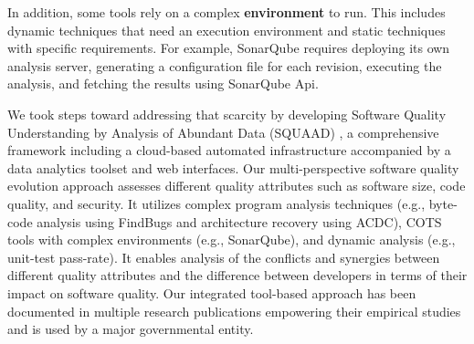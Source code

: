 In addition, some tools rely on a complex \textbf{environment} to run.
This includes dynamic techniques that need an execution environment and static techniques with specific requirements.
For example, SonarQube \citep{campbellsonarqube} requires deploying its own analysis server, generating a configuration file for each revision, executing the analysis, and fetching the results using SonarQube Api.

We took steps toward addressing that scarcity by developing Software Quality Understanding by Analysis of Abundant Data (SQUAAD) \citep{cser2018behnamghader}, a comprehensive framework including a cloud-based automated infrastructure accompanied by a data analytics toolset and web interfaces.
Our multi-perspective software quality evolution approach assesses
different quality attributes such as software size, code quality, and security.
It utilizes complex program analysis techniques (e.g., byte-code analysis using FindBugs and architecture recovery using ACDC), COTS tools with complex environments (e.g., SonarQube), and dynamic analysis (e.g., unit-test pass-rate).
It enables analysis of the conflicts and synergies between different quality attributes and the difference between developers in terms of their impact on software quality.
Our integrated tool-based approach has been documented in multiple research publications \citep{cser2018behnamghader,Behnamghader2018esem,Behnamghader2017qrs,Behnamghader2017,Alfayez2017stc, Alfayez2018TechDebt} empowering their empirical studies and is used by a major governmental entity.


